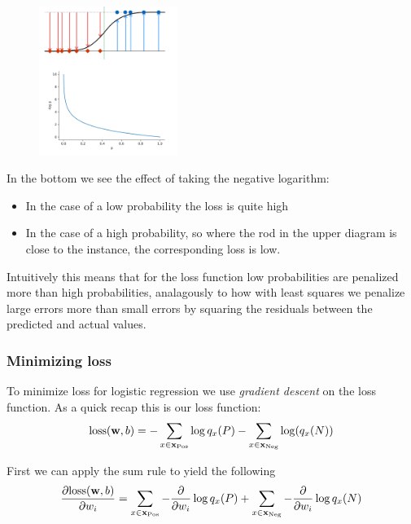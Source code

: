 \documentclass[12pt]{article}
\begin{document}
\begin{figure}[!h]
    \centering
    \includegraphics[width=0.4\textwidth]{assets/logloss.png}
\end{figure}

In the bottom we see the effect of taking the negative logarithm: 
\begin{itemize}[leftmargin=*, noitemsep]
    \item In the case of a low probability the loss is quite high 
    \item In the case of a high probability, so where the rod in the upper diagram is close to the instance, the corresponding loss is low. 
\end{itemize}
Intuitively this means that for the loss function low probabilities are penalized more than high probabilities, analagously to how with least squares we penalize large errors more than small errors by squaring the residuals between the predicted and actual values.

\subsubsection*{Minimizing loss}

To minimize loss for logistic regression we use \textit{gradient descent} on the loss function. As a quick recap this is our loss function: 
\[
    \text{loss}(\mathbf{w}, b) = -\sum_{x\in \mathbf{x} _\text{Pos}} \log q_x(P) - \sum_{x\in\mathbf{x}_\text{Neg}} \log (q_x(N))
\]

First we can apply the sum rule to yield the following 
\begin{align*}
    \frac{\partial \text{loss}(\mathbf{w}, b)}{\partial w_i} & = \sum_{x\in \mathbf{x} _\text{Pos}} -\frac{\partial}{\partial w_i} \log q_x(P) + \sum_{x\in\mathbf{x}_\text{Neg}} -\frac{\partial}{\partial w_i} \log q_x(N) \\
\end{align*}
\end{document}
